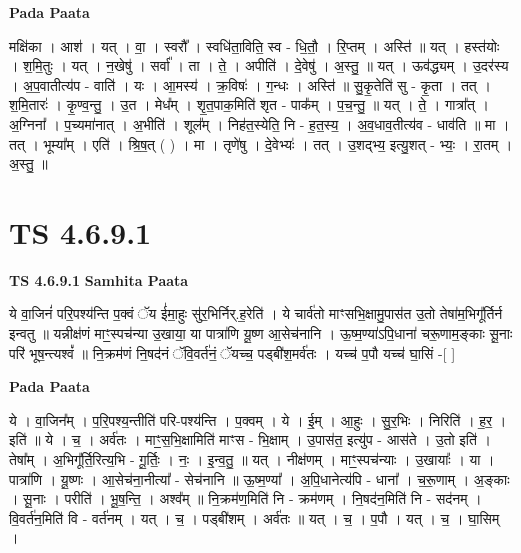 \documentclass[17pt]{extarticle}
\begin{document}
\textbf{Pada Paata} \newline

मक्षि॑का । आश॑ । यत् । वा॒ । स्वरौ᳚ । स्वधि॑ता॒विति॒ स्व - धि॒तौ॒ । रि॒प्तम् । अस्ति॑ ॥ यत् । हस्त॑योः । श॒मि॒तुः । यत् । न॒खेषु॑ । सर्वा᳚ । ता । ते॒ । अपीति॑ । दे॒वेषु॑ । अ॒स्तु॒ ॥ यत् । ऊव॑द्ध्यम् । उ॒दर॑स्य । अ॒प॒वातीत्य॑प - वाति॑ । यः । आ॒मस्य॑ । क्र॒विषः॑ । ग॒न्धः । अस्ति॑ ॥ सु॒कृ॒तेति॑ सु - कृ॒ता । तत् । श॒मि॒तारः॑ । कृ॒ण्व॒न्तु॒ । उ॒त । मेध᳚म् । शृ॒त॒पाक॒मिति॑ शृत - पाक᳚म् । प॒च॒न्तु॒ ॥ यत् । ते॒ । गात्रा᳚त् । अ॒ग्निना᳚ । प॒च्यमा॑नात् । अ॒भीति॑ । शूल᳚म् । निह॑त॒स्येति॒ नि - ह॒त॒स्य॒ । अ॒व॒धाव॒तीत्य॑व - धाव॑ति ॥ मा । तत् । भूम्या᳚म् । एति॑ । श्रि॒ष॒त् ( ) । मा । तृणे॑षु । दे॒वेभ्यः॑ । तत् । उ॒शद्भ्य॒ इत्यु॒शत् - भ्यः॒ । रा॒तम् । अ॒स्तु॒ ॥  \newline





\section{ TS 4.6.9.1 }

\textbf{TS 4.6.9.1 } \newline
\textbf{Samhita Paata} \newline

ये वा॒जिनं॑ परि॒पश्य॑न्ति प॒क्वं ॅय ई॑मा॒हुः सु॑र॒भिर्निर्.ह॒रेति॑ । ये चार्व॑तो माꣳसभि॒क्षामु॒पास॑त उ॒तो तेषा॑म॒भिगू᳚र्तिर्न इन्वतु ॥ यन्नीक्ष॑णं माꣳ॒॒स्पच॑न्या उ॒खाया॒ या पात्रा॑णि यू॒ष्ण आ॒सेच॑नानि । ऊ॒ष्म॒ण्या॑ऽपि॒धाना॑ चरू॒णाम॒ङ्काः सू॒नाः परि॑ भूष॒न्त्यश्वं᳚ ॥ नि॒क्रम॑णं नि॒षद॑नं ॅवि॒वर्त॑नं॒ ॅयच्च॒ पड्बी॑श॒मर्व॑तः । यच्च॑ प॒पौ यच्च॑ घा॒सिं -[  ] \newline

\textbf{Pada Paata} \newline

ये । वा॒जिन᳚म् । प॒रि॒पश्य॒न्तीति॑ परि-पश्य॑न्ति । प॒क्वम् । ये । ई॒म् । आ॒हुः । सु॒र॒भिः । निरिति॑ । ह॒र॒ । इति॑ ॥ ये । च॒ । अर्व॑तः । माꣳ॒॒स॒भि॒क्षामिति॑ माꣳस - भि॒क्षाम् । उ॒पास॑त॒ इत्यु॑प - आस॑ते । उ॒तो इति॑ । तेषा᳚म् । अ॒भिगू᳚र्ति॒रित्य॒भि - गू॒र्तिः॒ । नः॒ । इ॒न्व॒तु॒ ॥ यत् । नीक्ष॑णम् । माꣳ॒॒स्पच॑न्याः । उ॒खायाः᳚ । या । पात्रा॑णि । यू॒ष्णः । आ॒सेच॑ना॒नीत्या᳚ - सेच॑नानि ॥ ऊ॒ष्म॒ण्या᳚ । अ॒पि॒धानेत्य॑पि - धाना᳚ । च॒रू॒णाम् । अ॒ङ्काः । सू॒नाः । परीति॑ । भू॒ष॒न्ति॒ । अश्व᳚म् ॥ नि॒क्रम॑ण॒मिति॑ नि - क्रम॑णम् । नि॒षद॑न॒मिति॑ नि - सद॑नम् । वि॒वर्त॑न॒मिति॑ वि - वर्त॑नम् । यत् । च॒ । पड्बी॑शम् । अर्व॑तः ॥ यत् । च॒ । प॒पौ । यत् । च॒ । घा॒सिम् ।  \newline
\end{document}

